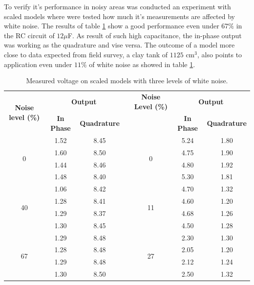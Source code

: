 \documentclass{vie16}
\begin{document}
To verify it's performance in noisy areas was conducted an experiment with scaled models where were
tested how much it's measurements are affected by white noise. The results of table \ref{t:scaled_models} show
a good performance even under $67\%$ in the RC circuit of $12 \mu$F. As result of such high capacitance, the in-phase 
output was working as the quadrature and vise versa. The outcome of a model more close to data expected from field survey, 
a clay tank of $1125$ cm$^3$, also points to application even under $11\%$ of white noise as showed in table \ref{t:scaled_models}.

\begin{table}[H]
\centering
\caption{Measured voltage on scaled models with three levels of white noise.}
\label{t:scaled_models}
\begin{tabular}{cccl|ccc}
\multirow{2}{*}{\textbf{Noise level (\%)}}  & \multicolumn{2}{c}{\textbf{Output}}     &  & \textbf{Noise Level (\%)} & \multicolumn{2}{c}{\textbf{Output}}     \\
                         & \textbf{In Phase}  & \textbf{Quadrature} &  &  	 				& \textbf{In Phase} & \textbf{Quadrature} 	\\
\multirow{4}{*}{0}	 		& 1.52              & 8.45                &  & 	\multirow{4}{*}{0}	&  5.24				&		1.80			\\
					 		& 1.60              & 8.50                &  &						&  4.75				&		1.90			\\
					 		& 1.44              & 8.46                &  &						&  4.80				&		1.92			\\
					 		& 1.48              & 8.40                &  &						&  5.30		    	&		1.81	 
                                         \\ \hline                                   
\multirow{4}{*}{40}	 		& 1.06              & 8.42                &  & 	\multirow{4}{*}{11}	&	4.70			&		1.32			\\
					 		& 1.28              & 8.41                &  &						&	4.60			&		1.20			\\
					 		& 1.29              & 8.37                &  &						&	4.68			&		1.26			\\
					 		& 1.30              & 8.45                &  &						&	4.50			&		1.28			  
                                         \\ \hline
\multirow{4}{*}{67}	 		& 1.29              & 8.48                &  & 	\multirow{4}{*}{27}	&	2.30			&		1.30			\\
					 		& 1.28              & 8.48                &  &						&	2.05			&		1.20			\\
					 		& 1.29              & 8.48                &  &						&	2.12			&		1.24			\\
					 		& 1.30              & 8.50                &  &						&	2.50			&		1.32			  
                                          \\ \hline
\end{tabular}
\end{table}
\end{document}
